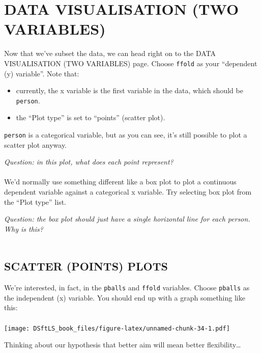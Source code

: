 \documentclass[
]{book}
\providecommand{\tightlist}{%
  \setlength{\itemsep}{0pt}\setlength{\parskip}{0pt}}
\begin{document}
\hypertarget{data-visualisation-two-variables}{%
\section{DATA VISUALISATION (TWO VARIABLES)}\label{data-visualisation-two-variables}}

Now that we've subset the data, we can head right on to the DATA VISUALISATION
(TWO VARIABLES) page. Choose \texttt{ffold} as your ``dependent (y) variable''. Note that:

\begin{itemize}
\tightlist
\item
  currently, the x variable is the first variable in the data, which should be
  \texttt{person}.
\item
  the ``Plot type'' is set to ``points'' (scatter plot).
\end{itemize}

\texttt{person} is a categorical variable, but as you can see, it's still possible to
plot a scatter plot anyway.

\emph{Question: in this plot, what does each point represent?}\\
~\\

We'd normally use something different like a box plot to plot a continuous
dependent variable against a categorical x variable. Try selecting box plot from
the ``Plot type'' list.

\emph{Question: the box plot should just have a single horizontal line for each
person. Why is this?}\\
~\\

\hypertarget{scatter-points-plots}{%
\subsection{SCATTER (POINTS) PLOTS}\label{scatter-points-plots}}

We're interested, in fact, in the \texttt{pballs} and \texttt{ffold} variables. Choose
\texttt{pballs} as the independent (x) variable. You should end up with a graph something
like this:\\
~\\

\texttt{[image: DSftLS\_book\_files/figure-latex/unnamed-chunk-34-1.pdf]}

Thinking about our hypothesis that
better aim will mean better flexibility\ldots{}
\end{document}

